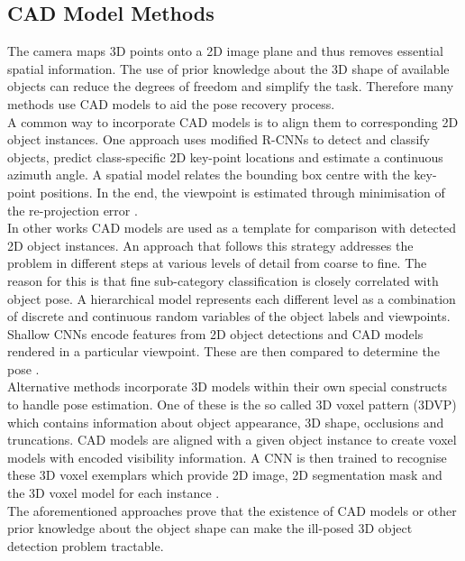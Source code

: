 \documentclass[main.tex]{subfiles}
\begin{document}
\subsection{CAD Model Methods}
\indent The camera maps 3D points onto a 2D image plane and thus removes essential spatial information. The use of prior knowledge about the 3D shape of available objects can reduce the degrees of freedom and simplify the task. Therefore many methods use CAD models to aid the pose recovery process.\\
\indent A common way to incorporate CAD models is to align them to corresponding 2D object instances. One approach uses modified R-CNNs to detect and classify objects, predict class-specific 2D key-point locations and estimate a continuous azimuth angle. A spatial model relates the bounding box centre with the key-point positions. In the end, the viewpoint is estimated through minimisation of the re-projection error \cite{Pepik2015}.\\
\indent In other works CAD models are used as a template for comparison with detected 2D object instances. An approach that follows this strategy addresses the problem in different steps at various levels of detail from coarse to fine. The reason for this is that fine sub-category classification is closely correlated with object pose. A hierarchical model represents each different level as a combination of discrete and continuous random variables of the object labels and viewpoints. Shallow CNNs encode features from 2D object detections and CAD models rendered in a particular viewpoint. These are then compared to determine the pose \cite{Mottaghi2015}.\\
\indent Alternative methods incorporate 3D models within their own special constructs to handle pose estimation. One of these is the so called 3D voxel pattern (3DVP) which contains information about object appearance, 3D shape, occlusions and truncations. CAD models are aligned with a given object instance to create voxel models with encoded visibility information. A CNN is then trained to recognise these 3D voxel exemplars which provide 2D image, 2D segmentation mask and the 3D voxel model for each instance \cite{Xiang2015}. \\
\indent The aforementioned approaches prove that the existence of CAD models or other prior knowledge about the object shape can make the ill-posed 3D object detection problem tractable.
\end{document}
